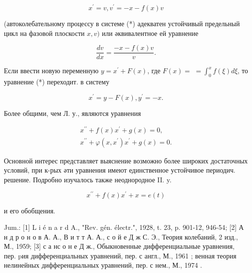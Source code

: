 \documentclass[10pt]{article}
\begin{document}
\[

x^{\prime}=v, v^{\prime}=-x-f(x) v

\]



(автоколебательному процессу в системе (*) адекватен устойчивый предельный цикл на фазовой плоскости $x, v)$ или әквивалентное ей уравнение



\[

\frac{d v}{d x}=\frac{-x-f(x) v}{v} .

\]



Если ввести новую переменную $y=x^{\prime}+F(x)$, где $F(x)=$ $=\int_{0}^{x} f(\xi) d \xi$, то уравнение (*) переходит. в систему



\[

x^{\prime}=y-F(x), y^{\prime}=-x .

\]



Более общими, чем Л. у., являются уравнения



\[

\begin{gathered}

x^{\prime \prime}+f(x) x^{\prime}+g(x)=0, \\

x^{\prime \prime}+\varphi\left(x, x^{\prime}\right) x^{\prime}+g(x)=0 .

\end{gathered}

\]



Основной интерес представляет выяснение возможно более широких достаточных условий, при к-рых әти уравнения имеют единственное устойчивое периодич. решение. Подробно изучалось также неоднородное II. y.



\[

x^{\prime \prime}+f(x) x^{\prime}+x=e(t)

\]



и его обобщения.



Jum.: [1] L i é n a r d A., "Rev. gén. électr.", 1928, t. 23, p. 901-12, 946-54; [2] А н д р о н о в А. А., В и т т А. А., с о й е Д ж С. Э., Теория колебаний, 2 изд., М., 1959; [3] с а нс о н е Д ж., Обыкновенные дифференциальные уравнения, пер. pия дифференциальных уравнений, пер. с англ., М., 1961 ; венная теория нелинейных дифференциальных уравнений, пер. с нем., М., 1974 .
\end{document}
